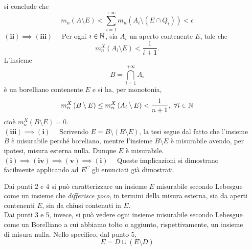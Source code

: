 \begin{demonstration}
si conclude che
\begin{equation*}
	m_n\left(A\setminus E\right)<\sum_{i=1}^{+\infty}m_n\left(A_i\setminus\left(E\cap Q_i\right)\right)<\epsilon
\end{equation*}
$\mathbf{(ii)\implies(iii)}\quad$ Per ogni $i\in\mathbb{N}$, sia $A_i$ un aperto contenente $E$, tale che
\begin{equation*}
	m^{X}_n\left(A_i\setminus E\right)<\frac{1}{i+1}.
\end{equation*}
L'insieme
\begin{equation*}
	B=\bigcap_{i=1}^{+\infty}A_i
\end{equation*}
è un borelliano contenente $E$ e si ha, per monotonia,
\begin{equation*}
	m_n^{X}\left(B\setminus E\right)\leq m_n^{X}\left(A_i\setminus E\right)<\frac{1}{n+1},\ \forall i\in \mathbb{N}
\end{equation*}
cioè $m_n^{X}\left(B\setminus E\right)=0$.\\
$\mathbf{(iii)\implies(i)}\quad$  Scrivendo $E=B\setminus\left(B\setminus E\right)$, la tesi segue dal fatto che l'insieme $B$ è misurabile perché boreliano, mentre l'insieme $B\setminus E$ è misurabile avendo, per ipotesi, misura esterna nulla. Dunque $E$ è misurabile.\\
$\mathbf{(i)\implies(iv)\implies(v)\implies(i)}\quad$ Queste implicazioni si dimostrano facilmente applicando ad $E^C$ gli enunciati già dimostrati. 
\end{demonstration}
\begin{observe}
	Dai punti 2 e 4 si può caratterizzare un insieme $E$ misurabile secondo Lebesgue come un insieme che \textit{differisce poco}, in termini della misura esterna, sia da aperti contenenti $E$, sia da chiusi contenuti in $E$.\\
	Dai punti 3 e 5, invece, si può vedere ogni insieme misurabile secondo Lebesgue come un Borelliano a cui abbiamo tolto o aggiunto, rispettivamente, un insieme di misura nulla. Nello specifico, dal punto 5,
	\begin{equation*}
		E=D\cup\left(E\setminus D\right)
	\end{equation*}
\end{observe}
